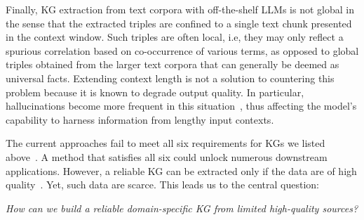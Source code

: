 \documentclass[10pt]{article}
\begin{document}
Finally, KG extraction from text corpora with off-the-shelf LLMs is not global in the sense that the extracted triples are confined to a single text chunk presented in the context window. Such triples are often local, i.e, they may only reflect a spurious correlation based on co-occurrence of various terms, as opposed to global triples obtained from the larger text corpora that can generally be deemed as universal facts. Extending context length is not a solution to countering this problem because it is known to degrade output quality. In particular, hallucinations become more frequent in this situation~\cite{an2024doeseffectivecontextlength}, thus affecting the model's capability to harness information from lengthy input contexts.

The current approaches fail to meet all six requirements for KGs we listed above~\cite{info15080509}. A method that satisfies all six could unlock numerous downstream applications.  
However, a reliable KG can be extracted only if the data are of high quality~\cite{rejeleene2024trustablelms, geiger2020garbage, wang2023dataquality}. Yet, such data are scarce.  
This leads us to the central question:
\begin{center}
    \textsl{How can we build a reliable domain-specific KG from limited high-quality sources?}
\end{center}
\end{document}

